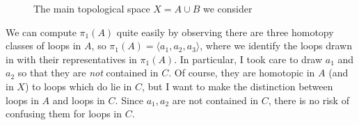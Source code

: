 \documentclass[11pt]{amsart}
\begin{document}
\begin{center}
\begin{figure}[h]
\caption{The main topological space $X = A \cup B$ we consider}\label{fig:Xnoloops}
\end{figure}
\end{center}

We can compute $\pi_1(A)$ quite easily by observing there are three homotopy classes of loops in $A$, so $\pi_1(A) = \langle a_1, a_2, a_3 \rangle$, where we identify the loops drawn in  with their representatives in $\pi_1(A)$. In particular, I took care to draw $a_1$ and $a_2$ so that they are \textit{not} contained in $C$. Of course, they are homotopic in $A$ (and in $X$) to loops which do lie in $C$, but I want to make the distinction between loops in $A$ and loops in $C$. Since $a_1, a_2$ are not contained in $C$, there is no risk of confusing them for loops in $C$. 
\end{document}
